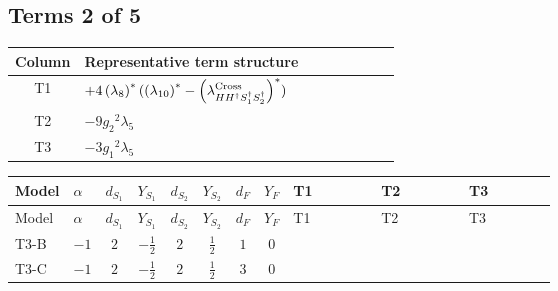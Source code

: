 \documentclass[8pt]{article}
\begin{document}
\begin{landscape}
\subsection*{Terms 2 of 5}
\begin{center}
\begin{tabular}{@{}c >{\raggedright\arraybackslash}p{0.82\linewidth}@{}}
\toprule
Column & Representative term structure \\
\midrule
T1 & \(\displaystyle +4 \left({\lambda_8}\right)^{*} (\left({\lambda_{10}}\right)^{*}-\left({\lambda_{H H^\dagger S_1^\dagger S_2^\dagger}^{\rm Cross}}\right)^{*})\) \\
\midrule
T2 & \(\displaystyle -9 {g_2}^2 {\lambda_5}\) \\
\midrule
T3 & \(\displaystyle -3 {g_1}^2 {\lambda_5}\) \\
\midrule
\bottomrule
\end{tabular}
\end{center}
\smallskip
\tiny
\begin{longtable}{@{}llcccccc >{\raggedright\arraybackslash}p{0.21\linewidth} >{\raggedright\arraybackslash}p{0.21\linewidth} >{\raggedright\arraybackslash}p{0.21\linewidth}@{}}
\toprule
Model & $\alpha$ & $d_{S_1}$ & $Y_{S_1}$ & $d_{S_2}$ & $Y_{S_2}$ & $d_F$ & $Y_F$ & T1 & T2 & T3 \\
\midrule
\endfirsthead
\toprule
Model & $\alpha$ & $d_{S_1}$ & $Y_{S_1}$ & $d_{S_2}$ & $Y_{S_2}$ & $d_F$ & $Y_F$ & T1 & T2 & T3 \\
\midrule
\endhead
T3-B & $-1$ & $2$ & $-\frac{1}{2}$ & $2$ & $\frac{1}{2}$ & $1$ & $0$ & \scriptsize\adjustbox{max width=\linewidth}{$\begin{gathered} +4 \left({\lambda_8}\right)^{*} (\left({\lambda_{10}}\right)^{*}-\left({\lambda_{H H^\dagger S_1^\dagger S_2^\dagger}^{\rm Cross}}\right)^{*})\end{gathered}$} & \scriptsize\adjustbox{max width=\linewidth}{$\begin{gathered} -9 {g_2}^2 {\lambda_5}\end{gathered}$} & \scriptsize\adjustbox{max width=\linewidth}{$\begin{gathered} -3 {g_1}^2 {\lambda_5}\end{gathered}$} \\
\midrule
T3-C & $-1$ & $2$ & $-\frac{1}{2}$ & $2$ & $\frac{1}{2}$ & $3$ & $0$ & \scriptsize\adjustbox{max width=\linewidth}{$\begin{gathered} +4 \left({\lambda_8}\right)^{*} (\left({\lambda_{10}}\right)^{*}-\left({\lambda_{H H^\dagger S_1^\dagger S_2^\dagger}^{\rm Cross}}\right)^{*})\end{gathered}$} & \scriptsize\adjustbox{max width=\linewidth}{$\begin{gathered} -9 {g_2}^2 {\lambda_5}\end{gathered}$} & \scriptsize\adjustbox{max width=\linewidth}{$\begin{gathered} -3 {g_1}^2 {\lambda_5}\end{gathered}$} \\

\end{longtable}
\end{landscape}
\end{document}
